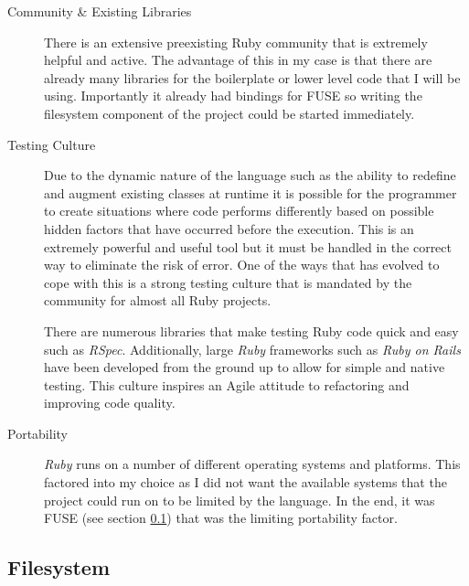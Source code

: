 \begin{description}

  \item[Community \& Existing Libraries] \hfill

    There is an extensive preexisting Ruby community that is extremely helpful
    and active. The advantage of this in my case is that there are already many
    libraries for the boilerplate or lower level code that I will be using.
    Importantly it already had bindings for \ac{FUSE} so writing the filesystem
    component of the project could be started immediately.

  \item[Testing Culture] \hfill

    Due to the dynamic nature of the language such as the ability to redefine
    and augment existing classes at runtime it is possible for the programmer
    to create situations where code performs differently based on possible
    hidden factors that have occurred before the execution. This is an
    extremely powerful and useful tool but it must be handled in the correct
    way to eliminate the risk of error. One of the ways that has evolved to
    cope with this is a strong testing culture that is mandated by the
    community for almost all Ruby projects.

    There are numerous libraries that make testing Ruby code quick and easy
    such as \emph{RSpec}. Additionally, large \emph{Ruby} frameworks such as
    \emph{Ruby on Rails} have been developed from the ground up to allow for
    simple and native testing. This culture inspires an Agile attitude to
    refactoring and improving code quality.

  \item[Portability] \hfill

    \emph{Ruby} runs on a number of different operating systems and platforms.
    This factored into my choice as I did not want the available systems that
    the project could run on to be limited by the language. In the end, it was
    \ac{FUSE} (see section \ref{ssec:filesystem}) that was the limiting
    portability factor.

\end{description}

\subsection{Filesystem}
\label{ssec:filesystem}

